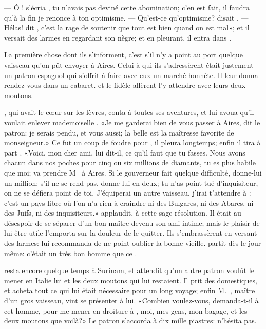 — Ô ! s’écria , tu n’avais pas deviné cette abomination;
c’en est fait, il faudra qu’à la fin je renonce à ton optimisme.
— Qu’est-ce qu’optimisme? disait . — Hélas! dit , c’est la
rage de soutenir que tout est bien quand on est mal»; et il versait des
larmes en regardant son nègre; et en pleurant, il entra dans .

La première chose dont ils s’informent, c’est s’il n’y a point au port
quelque vaisseau qu’on pût envoyer à  Aires. Celui à qui ils
s’adressèrent était justement un patron espagnol qui s’offrit à faire
avec eux un marché honnête. Il leur donna rendez-vous dans un cabaret.
 et le fidèle  allèrent l’y attendre avec leurs deux
moutons.


, qui avait le cœur sur les lèvres, conta à  toutes
ses aventures, et lui avoua qu’il voulait enlever mademoiselle
. «Je me garderai bien de vous passer à  Aires, dit le
patron: je serais pendu, et vous aussi; la belle  est la
maîtresse favorite de monseigneur.» Ce fut un coup de foudre pour
, il pleura longtemps; enfin il tira à part . «Voici, mon
cher ami, lui dit-il, ce qu’il faut que tu fasses. Nous avons chacun
dans nos poches pour cinq ou six millions de diamants, tu es plus
habile que moi; va prendre M~ à  Aires. Si le
gouverneur fait quelque difficulté, donne-lui un million: s’il ne se
rend pas, donne-lui-en deux; tu n’as point tué d’inquisiteur, on ne se
défiera point de toi. J’équiperai un autre vaisseau, j’irai t’attendre
à  : c’est un pays libre où l’on n’a rien à craindre ni des
Bulgares, ni des Abares, ni des Juifs, ni des inquisiteurs.» 
applaudit, à cette sage résolution. Il était au désespoir de se séparer
d’un bon maître devenu son ami intime; mais le plaisir de lui être
utile l’emporta sur la douleur de le quitter. Ils s’embrassèrent en
versant des larmes:  lui recommanda de ne point oublier la bonne
vieille.  partit dès le jour même: c’était un très bon homme que
ce .

 resta encore quelque temps à Surinam, et attendit qu’un autre
patron voulût le mener en Italie lui et les deux moutons qui lui
restaient. Il prit des domestiques, et acheta tout ce qui lui était
nécessaire pour un long voyage; enfin M.~, maître d’un gros
vaisseau, vint se présenter à lui. «Combien voulez-vous, demanda-t-il à
cet homme, pour me mener en droiture à  , moi, mes gens, mon
bagage, et les deux moutons que voilà?» Le patron s’accorda à dix mille
piastres:  n’hésita pas.


